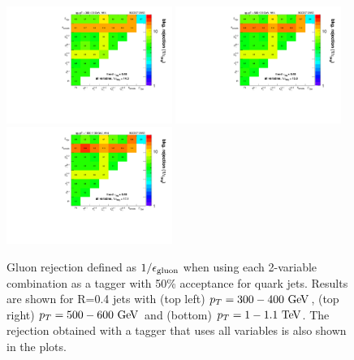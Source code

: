 \begin{figure}
\centering
\includegraphics[width=0.48\textwidth]{./Figures/QGTagging/pT300/AKtR04/effBkg2D.pdf}
\includegraphics[width=0.48\textwidth]{./Figures/QGTagging/pT500/AKtR04/effBkg2D.pdf}
\includegraphics[width=0.48\textwidth]{./Figures/QGTagging/pT1000/AKtR04/effBkg2D.pdf}
\caption{Gluon rejection defined as $1/\epsilon_{\rm gluon}$ when using each 2-variable combination 
as a tagger with 50\% acceptance for quark jets. Results are shown for R=0.4 jets with (top left) $\pt=300-400 \GeV$, 
(top right) $\pt=500-600 \GeV$ and (bottom) $\pt=1-1.1 \TeV$. The rejection obtained with a tagger that uses all variables is also shown
in the plots. }
\label{fig:qg_akt4_comb}
\end{figure}
